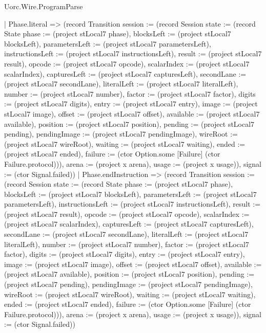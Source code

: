 \begin{lexlean}{Uorc.Wire.ProgramParse}
\begin{semanticmodule}
{    | Phase.literal => (record Transition {session := (record Session {state := (record State {phase := (project stLocal7 phase), blocksLeft := (project stLocal7 blocksLeft), parametersLeft := (project stLocal7 parametersLeft), instructionsLeft := (project stLocal7 instructionsLeft), result := (project stLocal7 result), opcode := (project stLocal7 opcode), scalarIndex := (project stLocal7 scalarIndex), capturesLeft := (project stLocal7 capturesLeft), secondLane := (project stLocal7 secondLane), literalLeft := (project stLocal7 literalLeft), number := (project stLocal7 number), factor := (project stLocal7 factor), digits := (project stLocal7 digits), entry := (project stLocal7 entry), image := (project stLocal7 image), offset := (project stLocal7 offset), available := (project stLocal7 available), position := (project stLocal7 position), pending := (project stLocal7 pending), pendingImage := (project stLocal7 pendingImage), wireRoot := (project stLocal7 wireRoot), waiting := (project stLocal7 waiting), ended := (project stLocal7 ended), failure := (ctor Option.some [Failure] (ctor Failure.protocol))}), arena := (project x arena), usage := (project x usage)}), signal := (ctor Signal.failed)})
    | Phase.endInstruction => (record Transition {session := (record Session {state := (record State {phase := (project stLocal7 phase), blocksLeft := (project stLocal7 blocksLeft), parametersLeft := (project stLocal7 parametersLeft), instructionsLeft := (project stLocal7 instructionsLeft), result := (project stLocal7 result), opcode := (project stLocal7 opcode), scalarIndex := (project stLocal7 scalarIndex), capturesLeft := (project stLocal7 capturesLeft), secondLane := (project stLocal7 secondLane), literalLeft := (project stLocal7 literalLeft), number := (project stLocal7 number), factor := (project stLocal7 factor), digits := (project stLocal7 digits), entry := (project stLocal7 entry), image := (project stLocal7 image), offset := (project stLocal7 offset), available := (project stLocal7 available), position := (project stLocal7 position), pending := (project stLocal7 pending), pendingImage := (project stLocal7 pendingImage), wireRoot := (project stLocal7 wireRoot), waiting := (project stLocal7 waiting), ended := (project stLocal7 ended), failure := (ctor Option.some [Failure] (ctor Failure.protocol))}), arena := (project x arena), usage := (project x usage)}), signal := (ctor Signal.failed)})
}
\end{semanticmodule}
\end{lexlean}
